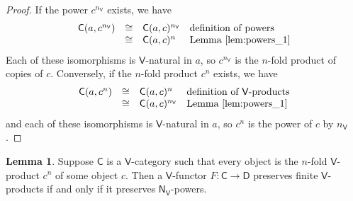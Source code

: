 \documentclass{amsart}
\theoremstyle{definition}
\newtheorem{lemma}[theorem]{Lemma}
\newcommand{\NN}{\mathsf{N}}
\newcommand{\A}{\mathsf{A}}
\newcommand{\V}{\mathsf{V}}
\newcommand{\D}{\mathsf{D}}
\newcommand{\C}{\mathsf{C}}
\newcommand{\op}{\mathrm{op}}
\newcommand{\maps}{\colon}
\begin{document}
\begin{proof}
If the power $c^{n_\V}$ exists, we have
\[    
\begin{array}{rcll}
	 \C(a,c^{n_\V}) &\cong& \C(a,c)^{n_\V} & \text{definition of powers} \\
	 &\cong & \C(a,c)^n & \text{Lemma \ref{lem:powers_1}} \\
\end{array}
\]
Each of these isomorphisms is 
$\V$-natural in $a$, so $c^{n_\V}$ is the $n$-fold product of copies of $c$.  Conversely,
if the $n$-fold product $c^n$ exists, we have
\[    
\begin{array}{rcll}
	 \C(a,c^n) &\cong& \C(a,c)^n & \text{definition of $\V$-products} \\
	 &\cong & \C(a,c)^{n_\V} & \text{Lemma \ref{lem:powers_1}} \\
\end{array}
\]
and each of these isomorphisms is 
$\V$-natural in $a$, so $c^n$ is the power of $c$ by $n_\V$.
\end{proof}

\iffalse
\begin{lemma}
If $\V$ is a cartesian category with chosen coproducts of the initial object then a
$\V$-category $\C$ has powers by all objects $n_\V$ of $\NN_\V$ if and only $\C^\op$
has finite coproducts.
\end{lemma}

\begin{proof}
Uniqueness holds because $\A_\V$ is skeletal.  We need to show 
that any natural numbers $m,n$ and $a \in \V$ there is an isomorphism
\[     \A_\V(a, (mn)_\V) \cong \A_\V(a,m_\V)^n  .....\]
\[\begin{array}{rcll}
	\underline{\NN}_\V((mn)_\V, a) & \cong & \underline{\NN}_\V(m \cdot n_\V,a) & \text{Lemma \ref{lem:NN}} \\
	&\cong &  a^{m \cdot n_\V} & \text{definition of hom-objects in $\underline{\NN}_\V$} \\
	&\cong & \prod_{i=1}^m a^{n_\V} & \text{exponentiation maps coproducts to products} \\
	&\cong & \prod_{i=1}^m a^n  & \text{Lemma \ref{lem:powers_1}} \\
	&\cong& a^{mn} \\
	&\cong& 
\end{array}
\]
\end{proof}	
\fi

\begin{lemma}
\label{lem:powers_3}
Suppose $\C$ is a $\V$-category such that every object is the $n$-fold $\V$-product $c^n$ of
some object $c$.   Then a $\V$-functor $F \maps \C \to \D$ preserves finite $\V$-products
if and only if it preserves $\NN_\V$-powers.
\end{lemma}
\end{document}
